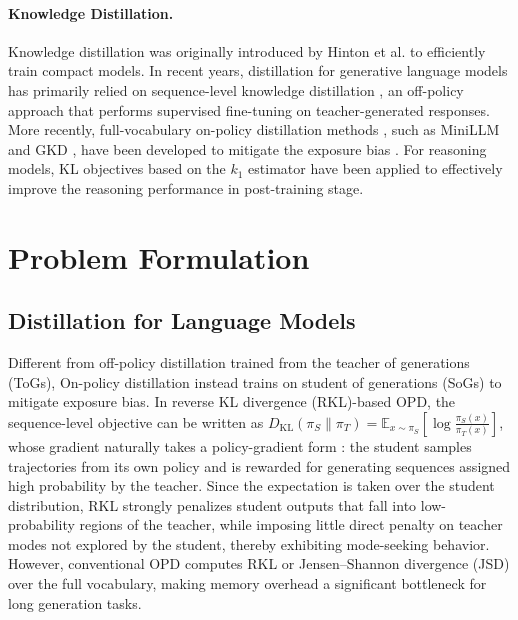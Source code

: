 \documentclass{llmxive}
\providecommand{\cite}[1]{\citep{#1}}
\begin{document}
\paragraph{Knowledge Distillation.}
Knowledge distillation was originally introduced by Hinton et al. \cite{hinton2015distilling} to efficiently train compact models. In recent years, distillation for generative language models has primarily relied on sequence-level knowledge distillation \cite{kim2016sequence}, an off-policy approach that performs supervised fine-tuning on teacher-generated responses. More recently, full-vocabulary on-policy distillation methods \cite{ko2024distillm,ko2025distillm,xu2025speculative}, such as MiniLLM \cite{gu2024minillm} and GKD \cite{agarwal2024onpolicy}, have been developed to mitigate the exposure bias \cite{agarwal2024onpolicy}. For reasoning models, KL objectives based on the $k_1$ estimator \cite{lu2025onpolicy,yang2026learning} have been applied to effectively improve the reasoning performance in post-training stage.




\section{Problem Formulation}

\subsection{Distillation for Language Models}
Different from off-policy distillation trained from the teacher of generations (ToGs), 
On-policy distillation instead trains on student of generations (SoGs) to mitigate exposure bias. In reverse KL divergence (RKL)-based OPD, the sequence-level objective can be written as $D_{\mathrm{KL}}(\pi_S \| \pi_T) = \mathbb{E}_{x \sim \pi_S}\left[\log \frac{\pi_S(x)}{\pi_T(x)}\right]$, whose gradient naturally takes a policy-gradient form \cite{gu2024minillm}: the student samples trajectories from its own policy and is rewarded for generating sequences assigned high probability by the teacher. Since the expectation is taken over the student distribution, RKL strongly penalizes student outputs that fall into low-probability regions of the teacher, while imposing little direct penalty on teacher modes not explored by the student, thereby exhibiting mode-seeking behavior. 
However, conventional OPD computes RKL or Jensen--Shannon divergence (JSD) over the full vocabulary, making memory overhead a significant bottleneck for long generation tasks.
\end{document}
